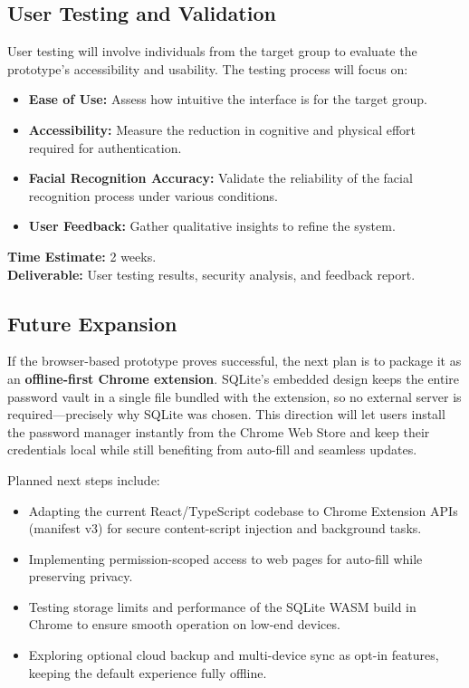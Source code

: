 \subsection{User Testing and Validation}
User testing will involve individuals from the target group to evaluate the prototype’s accessibility and usability. The testing process will focus on:
\begin{itemize}
    \item \textbf{Ease of Use:} Assess how intuitive the interface is for the target group.
    \item \textbf{Accessibility:} Measure the reduction in cognitive and physical effort required for authentication.
    \item \textbf{Facial Recognition Accuracy:} Validate the reliability of the facial recognition process under various conditions.
    \item \textbf{User Feedback:} Gather qualitative insights to refine the system.
\end{itemize}
\textbf{Time Estimate:} 2 weeks. \\  
\textbf{Deliverable:} User testing results, security analysis, and feedback report.


\subsection{Future Expansion}
If the browser-based prototype proves successful, the next plan is to
package it as an \textbf{offline-first Chrome extension}.  
SQLite's embedded design keeps the entire password vault in a single file
bundled with the extension, so no external server is required—precisely why
SQLite was chosen.  This direction will let users install the password manager
instantly from the Chrome Web Store and keep their credentials local while
still benefiting from auto-fill and seamless updates.

Planned next steps include:
\begin{itemize}
  \item Adapting the current React/TypeScript codebase to Chrome Extension
        APIs (manifest v3) for secure content-script injection and
        background tasks.
  \item Implementing permission-scoped access to web pages for auto-fill
        while preserving privacy.
  \item Testing storage limits and performance of the SQLite WASM build in
        Chrome to ensure smooth operation on low-end devices.
  \item Exploring optional cloud backup and multi-device sync as opt-in
        features, keeping the default experience fully offline.
\end{itemize}

